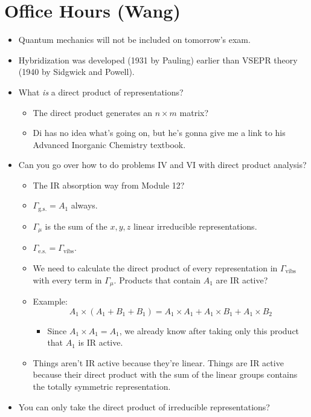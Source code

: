\documentclass[../notes.tex]{subfiles}
\begin{document}
\section{Office Hours (Wang)}
\begin{itemize}
    \item Quantum mechanics will not be included on tomorrow's exam.
    \item Hybridization was developed (1931 by Pauling) earlier than VSEPR theory (1940 by Sidgwick and Powell).
    \item What \emph{is} a direct product of representations?
    \begin{itemize}
        \item The direct product generates an $n\times m$ matrix?
        \item Di has no idea what's going on, but he's gonna give me a link to his Advanced Inorganic Chemistry textbook.
    \end{itemize}
    \item Can you go over how to do problems IV and VI with direct product analysis?
    \begin{itemize}
        \item The IR absorption way from Module 12?
        \item $\Gamma_\text{g.s.}=A_1$ always.
        \item $\Gamma_\mu$ is the sum of the $x,y,z$ linear irreducible representations.
        \item $\Gamma_\text{e.s.}=\Gamma_\text{vibs}$.
        \item We need to calculate the direct product of every representation in $\Gamma_\text{vibs}$ with every term in $\Gamma_\mu$. Products that contain $A_1$ are IR active?
        \item Example:
        \begin{equation*}
            A_1\times(A_1+B_1+B_1) = A_1\times A_1+A_1\times B_1+A_1\times B_2
        \end{equation*}
        \begin{itemize}
            \item Since $A_1\times A_1=A_1$, we already know after taking only this product that $A_1$ is IR active.
        \end{itemize}
        \item Things aren't IR active because they're linear. Things are IR active because their direct product with the sum of the linear groups contains the totally symmetric representation.
    \end{itemize}
    \item You can only take the direct product of irreducible representations?
\end{itemize}
\end{document}
